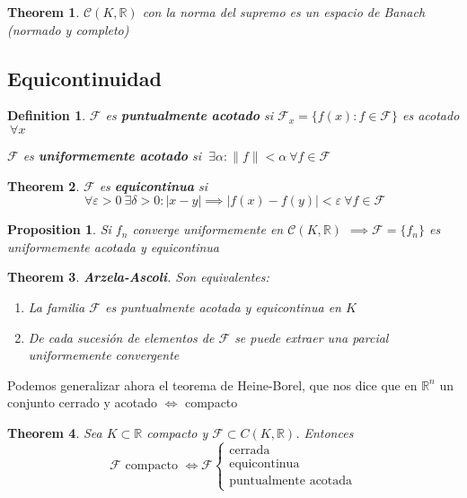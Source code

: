 \documentclass{myclass}
\newtheorem*{definition}{Definition}
\newtheorem*{theorem}{Theorem}
\newtheorem*{proposition}{Proposition}
\begin{document}
\begin{theorem}
  $\mathcal{C}(K, \mathbb{R}) $ con la norma del supremo es un espacio de Banach (normado y completo)
\end{theorem}

\subsection{Equicontinuidad}

\begin{definition}
$\mathcal{F}$ es \textbf{puntualmente acotado} si $\mathcal{F}_x = \{f(x): f\in \mathcal{F}\}$ es acotado $\ \forall x$

$\mathcal{F}$ es \textbf{uniformemente acotado} si $\ \exists \alpha : \|f\|<\alpha \ \forall f\in \mathcal{F}$
\end{definition}

\begin{theorem}
$\mathcal{F}$ es \textbf{equicontinua} si 
\[
\ \forall \varepsilon >0 \ \exists \delta >0 : |x-y| \implies |f(x)-f(y)| < \varepsilon \ \forall f\in \mathcal{F}
\] 
\end{theorem}

\begin{proposition}
Si $f_n$ converge uniformemente en $\mathcal{C}(K, \mathbb{R})$ $\implies \mathcal{F} = \{f_n\}$ es uniformemente acotada y equicontinua
\end{proposition}

\begin{theorem}
\textbf{Arzela-Ascoli}. Son equivalentes:
\begin{enumerate}[topsep=0pt, itemsep=0pt]
  \item La familia $\mathcal{F}$ es puntualmente acotada y equicontinua en $K$
  \item De cada sucesión de elementos de $\mathcal{F}$ se puede extraer una parcial uniformemente convergente
\end{enumerate}
\end{theorem}
Podemos generalizar ahora el teorema de Heine-Borel, que nos dice que en $\mathbb{R}^n$ un conjunto cerrado y acotado $\iff$ compacto
\begin{theorem}
Sea $K\subset \mathbb{R}$ compacto y $\mathcal{F}\subset C(K, \mathbb{R})$. Entonces
\[
  \mathcal{F} \text{ compacto } \iff \mathcal{F} \begin{cases} 
	\text{cerrada}\\
	\text{equicontinua}\\
	\text{puntualmente acotada}
  \end{cases}
\] 
\end{theorem}
\end{document}
